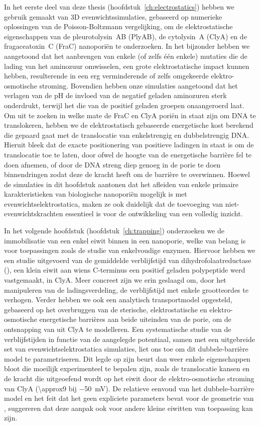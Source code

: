 In het eerste deel van deze thesis (hoofdstuk~\ref{ch:electrostatics}) hebben we gebruik gemaakt van 3D
evenwichtssimulaties, gebaseerd op numerieke oplossingen van de Poisson-Boltzmann vergelijking, om de
elektrostatische eigenschappen van de pleurotolysin~AB (PlyAB), de cytolysin~A (ClyA) en de fragaceatoxin~C
(FraC) nanopori\"{e}n te onderzoeken. In het bijzonder hebben we aangetoond dat het aanbrengen van enkele (of
zelfs \'{e}\'{e}n enkele) mutaties die de lading van het aminozuur omwisselen, een grote elektrostatische
impact kunnen hebben, resulterende in een erg verminderende of zelfs omgekeerde elektro-osmotische stroming.
Bovendien hebben onze simulaties aangetoond dat het verlagen van de pH de invloed van de negatief geladen
aminozuren sterk onderdrukt, terwijl het die van de positief geladen groepen onaangeroerd laat. Om uit te
zoeken in welke mate de FraC en ClyA pori\"{e}n in staat zijn om DNA te translokeren, hebben we de
elektrostatisch gebaseerde energetische kost berekend die gepaard gaat met de translocatie van enkelstrengig
en dubbelstrengig DNA. Hieruit bleek dat de exacte positionering van positieve ladingen in staat is om de
translocatie toe te laten, door ofwel de hoogte van de energetische barri\`{e}re fel te doen afnemen, of door
de DNA streng diep genoeg in de porie te doen binnendringen zodat deze de kracht heeft om de barri\`{e}re te
overwinnen. Hoewel de simulaties in dit hoofdstuk aantonen dat het afleiden van enkele primaire
karakteristieken van biologische nanopori\"{e}n mogelijk is met evenwichtselektrostatica, maken ze ook
duidelijk dat de toevoeging van niet-evenwichtskrachten essentieel is voor de ontwikkeling van een volledig
inzicht.

In het volgende hoofdstuk (hoofdstuk~\ref{ch:trapping}) onderzoeken we de immobilisatie van een enkel eiwit
binnen in een nanoporie, welke van belang is voor toepassingen zoals de studie van enkelvoudige enzymen.
Hiervoor hebben we een studie uitgevoerd van de gemiddelde verblijfstijd van dihydrofolaatreductase
(\DHFRt{}), een klein eiwit aan wiens C-terminus een positief geladen polypeptide werd vastgemaakt, in ClyA.
Meer concreet zijn we erin geslaagd om, door het manipuleren van de ladingsverdeling, de verblijfstijd met
enkele grootteordes te verhogen. Verder hebben we ook een analytisch transportmodel opgesteld, gebaseerd op
het overbruggen van de sterische, elektrostatische en elektro-osmotische energetische barri\`{e}res aan beide
uiteinden van de porie, om de ontsnapping van \DHFRt{} uit ClyA te modelleren. Een systematische studie van de
verblijfstijden in functie van de aangelegde potentiaal, samen met een uitgebreide set van
evenwichtselektrostatica simulaties, liet ons toe om dit dubbele-barri\`{e}re model te parametriseren. Dit
legde op zijn beurt dan weer enkele eigenschappen bloot die moeilijk experimenteel te bepalen zijn, zoals de
translocatie kansen en de kracht die uitgeoefend wordt op het eiwit door de elektro-osmotische stroming van
ClyA (\SI{\approx9}{\pN} bij \SI{-50}{\mV}). De relatieve eenvoud van het dubbele-barri\`{e}re model en het
feit dat het geen expliciete parameters bevat voor de geometrie van \DHFRt{}, suggereren dat deze aanpak ook
voor andere kleine eiwitten van toepassing kan zijn.

